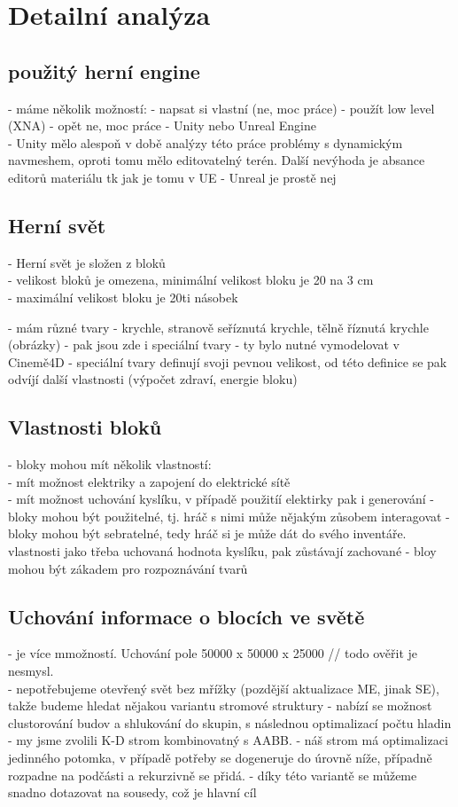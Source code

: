 
\chapter{Detailní analýza}

\section{použitý herní engine}
- máme několik možností:
- napsat si vlastní (ne, moc práce)
- použít low level (XNA) - opět ne, moc práce
- Unity nebo Unreal Engine\\
- Unity mělo alespoň v době analýzy této práce problémy s dynamickým navmeshem, oproti tomu mělo editovatelný terén. Další nevýhoda je absance editorů materiálu tk jak je tomu v UE
- Unreal je prostě nej

\section{Herní svět}

- Herní svět je složen z bloků\\
- velikost bloků je omezena, minimální velikost bloku je 20 na 3 cm\\
- maximální velikost bloku je 20ti násobek

- mám různé tvary - krychle, stranově seříznutá krychle, tělně říznutá krychle (obrázky)
- pak jsou zde i speciální tvary - ty bylo nutné vymodelovat v Cinemě4D
- speciální tvary definují svoji pevnou velikost, od této definice se pak odvíjí další vlastnosti (výpočet zdraví, energie bloku)

\section{Vlastnosti bloků}
- bloky mohou mít několik vlastností:\\
- mít možnost elektriky a zapojení do elektrické sítě\\
- mít možnost uchování kyslíku, v případě použitíí elektirky pak i generování
- bloky mohou být použitelné, tj. hráč s nimi může nějakým zůsobem interagovat
- bloky mohou být sebratelné, tedy hráč si je může dát do svého inventáře. vlastnosti jako třeba uchovaná hodnota kyslíku, pak zůstávají zachované
- bloy mohou být zákadem pro rozpoznávání tvarů

\section{Uchování informace o blocích ve světě}
- je více mmožností. Uchování pole 50000 x 50000 x 25000 // todo ověřit
je nesmysl. \\
- nepotřebujeme otevřený svět bez mřížky (pozdější aktualizace ME, jinak SE), takže budeme hledat nějakou variantu stromové struktury
- nabízí se možnost clustorování budov a shlukování do skupin, s následnou optimalizací počtu hladin
- my jsme zvolili K-D strom kombinovatný s AABB.
- náš strom  má optimalizaci jedinného potomka, v případě potřeby se dogeneruje do úrovně níže, případně rozpadne na podčásti a rekurzivně se přidá.
- díky této variantě se můžeme snadno dotazovat na sousedy, což je hlavní cíl

